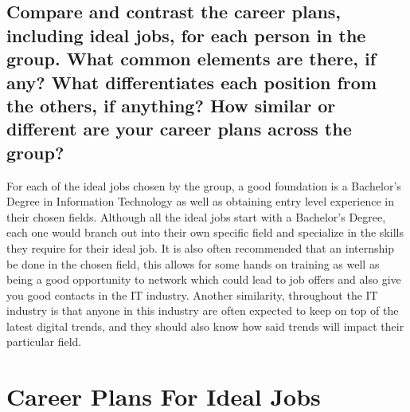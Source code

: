 \documentclass[11pt, oneside, a4paper, titlepage]{article}
\begin{document}
\subsection{Compare and contrast the career plans, including ideal jobs, for each person in the group. What common elements are there, if any? What differentiates each position from the others, if anything? How similar or different are your career plans across the group?}
For each of the ideal jobs chosen by the group, a good foundation is a Bachelor’s Degree in Information Technology as well as obtaining entry level experience in their chosen fields. Although all the ideal jobs start with a Bachelor’s Degree, each one would branch out into their own specific field and specialize in the skills they require for their ideal job. It is also often recommended that an internship be done in the chosen field, this allows for some hands on training as well as being a good opportunity to network which could lead to job offers and also give you good contacts in the IT industry. Another similarity, throughout the IT industry is that anyone in this industry are often expected to keep on top of the latest digital trends, and they should also know how said trends will impact their particular field. 


\section{Career Plans For Ideal Jobs}
\end{document}
